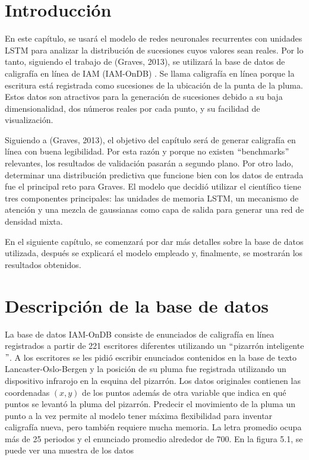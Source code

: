 \section{Introducción}
En este capítulo, se usará el modelo de redes neuronales recurrentes con unidades LSTM para analizar la distribución de sucesiones cuyos valores sean reales. Por lo tanto, siguiendo el trabajo de (Graves, 2013), se utilizará la base de datos de caligrafía en línea de IAM (IAM-OnDB) \cite{handwriting}. 
Se llama caligrafía en línea porque la escritura está registrada como sucesiones de la ubicación de la punta de la pluma. Estos datos son atractivos para la generación de sucesiones debido a su baja dimensionalidad, dos números reales por cada punto, y su facilidad de visualización. 
\cite{handwriting}
\cite{DBLP:journals/corr/Graves13}


\vspace{1em}

Siguiendo a (Graves, 2013), el objetivo del capítulo será de generar caligrafía en línea con buena legibilidad. Por esta razón y porque no existen $``$benchmarks$"$ relevantes, los resultados de validación pasarán a segundo plano. Por otro lado, determinar una distribución predictiva que funcione bien con los datos de entrada fue el principal reto para Graves. El modelo que decidió utilizar el científico tiene tres componentes principales: las unidades de memoria LSTM, un mecanismo de atención y una mezcla de gaussianas como capa de salida para generar una red de densidad mixta. 

\vspace{1em}

En el siguiente capítulo, se comenzará por dar más detalles sobre la base de datos utilizada, después se explicará el modelo empleado y, finalmente, se mostrarán los resultados obtenidos.


\section{Descripción de la base de datos}
La base de datos IAM-OnDB consiste de enunciados de caligrafía en línea registrados a partir de 221 escritores diferentes utilizando un $``$pizarrón inteligente$"$. A los escritores se les pidió escribir enunciados contenidos en la base de texto Lancaster-Oslo-Bergen y la posición de su pluma fue registrada utilizando un dispositivo infrarojo en la esquina del pizarrón. Los datos originales contienen las coordenadas $(x,y)$ de los puntos además de otra variable que indica en qué puntos se levantó la pluma del pizarrón. Predecir el movimiento de la pluma un punto a la vez permite al modelo tener máxima flexibilidad para inventar caligrafía nueva, pero también requiere mucha memoria. La letra promedio ocupa más de 25 periodos y el enunciado promedio alrededor de 700. En la figura 5.1, se puede ver una muestra de los datos
\cite{DBLP:journals/corr/Graves13}


